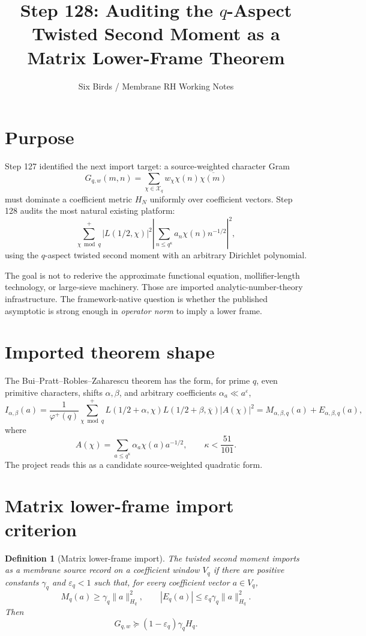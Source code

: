 \documentclass[11pt]{article}
\title{Step 128: Auditing the $q$-Aspect Twisted Second Moment as a Matrix Lower-Frame Theorem}
\author{Six Birds / Membrane RH Working Notes}
\date{}
\newtheorem{definition}{Definition}
\begin{document}
\maketitle

\section*{Purpose}
Step 127 identified the next import target: a source-weighted character Gram
\[
G_{q,w}(m,n)=\sum_{\chi\in\mathcal X_q} w_\chi\chi(n)\overline{\chi(m)}
\]
must dominate a coefficient metric $H_N$ uniformly over coefficient vectors. Step 128 audits the
most natural existing platform:
\[
\sum_{\chi\bmod q}^{+} |L(1/2,\chi)|^2\left|\sum_{n\le q^\kappa} a_n\chi(n)n^{-1/2}\right|^2,
\]
using the $q$-aspect twisted second moment with an arbitrary Dirichlet polynomial.

The goal is not to rederive the approximate functional equation, mollifier-length technology, or
large-sieve machinery. Those are imported analytic-number-theory infrastructure. The framework-native
question is whether the published asymptotic is strong enough in \emph{operator norm} to imply a lower frame.

\section{Imported theorem shape}
The Bui--Pratt--Robles--Zaharescu theorem has the form, for prime $q$, even primitive characters, shifts
$\alpha,\beta$, and arbitrary coefficients $\alpha_a\ll a^\varepsilon$,
\[
I_{\alpha,\beta}(a)=\frac1{\varphi^+(q)}\sum_{\chi\bmod q}^{+}
L(1/2+\alpha,\chi)L(1/2+\beta,\overline\chi)|A(\chi)|^2
=M_{\alpha,\beta,q}(a)+E_{\alpha,\beta,q}(a),
\]
where
\[
A(\chi)=\sum_{a\le q^\kappa}\alpha_a\chi(a)a^{-1/2},
\qquad \kappa<\frac{51}{101}.
\]
The project reads this as a candidate source-weighted quadratic form.

\section{Matrix lower-frame import criterion}
\begin{definition}[Matrix lower-frame import]
The twisted second moment imports as a membrane source record on a coefficient window $V_q$ if there are
positive constants $\gamma_q$ and $\varepsilon_q<1$ such that, for every coefficient vector $a\in V_q$,
\[
M_q(a)\ge \gamma_q\|a\|_{H_q}^2,
\qquad |E_q(a)|\le \varepsilon_q\gamma_q\|a\|_{H_q}^2.
\]
Then
\[
G_{q,w}\succeq (1-\varepsilon_q)\gamma_q H_q.
\]
\end{definition}
\end{document}
